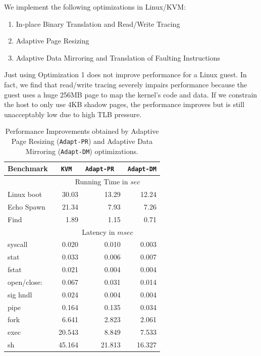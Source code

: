 \documentclass[10pt,twocolumn]{article}
\begin{document}
We implement the following optimizations in Linux/KVM:
\begin{enumerate}
  \item In-place Binary Translation and Read/Write Tracing
  \item Adaptive Page Resizing
  \item Adaptive Data Mirroring and Translation of Faulting Instructions
\end{enumerate}
Just using Optimization 1 does not improve performance for a Linux guest.
In fact, we find that read/write tracing severely impairs performance because
the guest uses a huge 256MB page to map the kernel's code and data. If we
constrain the host to only use 4KB shadow pages, the performance improves
but is still unacceptably low due to high TLB pressure.

\begin{table}
\centering
      \begin{tabular}{|l| r r r |} \hline
        Benchmark\verb, ,& {\tt KVM} \verb, , & {\tt Adapt-PR} \verb, , & {\tt Adapt-DM}  \\ \hline
     & \multicolumn{3}{c|}{ Running Time in $sec$}\\ \cline {2-4}  
Linux boot	&	30.03	&	13.29	&	12.24	\\
Echo Spawn	&	21.34	&	7.93	&	7.26	\\
Find	&	1.89	&	1.15	&	0.71	\\
\cline{2-4}
	   
     & \multicolumn{3}{c|}{Latency in $msec$}\\  \cline{2-4}
syscall	&	0.020	&	0.010	&	0.003	\\
stat	&	0.033	&	0.006	&	0.007	\\
fstat	&	0.021	&	0.004	&	0.004	\\
open/close:	&	0.067	&	0.031	&	0.014	\\
sig hndl	&	0.024	&	0.004	&	0.004	\\
pipe 	&	0.164	&	0.135	&	0.034	\\
fork	&	6.641	&	2.823	&	2.061	\\
exec	&	20.543	&	8.849	&	7.533	\\
sh	&	45.164	&	21.813	&	16.327	\\
 \hline
      \end{tabular}
\label{tab:detailed_results}
\caption{Performance Improvements obtained by Adaptive Page Resizing ({\tt Adapt-PR}) and Adaptive Data Mirroring ({\tt Adapt-DM}) optimizations.}
\end{table} 
\end{document}
